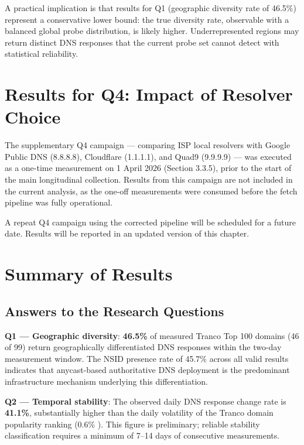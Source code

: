 A practical implication is that results for Q1 (geographic diversity rate of 46.5\%) represent a conservative lower bound: the true diversity rate, observable with a balanced global probe distribution, is likely higher. Underrepresented regions may return distinct DNS responses that the current probe set cannot detect with statistical reliability.

\bigskip
\section{Results for Q4: Impact of Resolver Choice}
\label{sec:4.5}

The supplementary Q4 campaign --- comparing ISP local resolvers with Google Public DNS (8.8.8.8), Cloudflare (1.1.1.1), and Quad9 (9.9.9.9) --- was executed as a one-time measurement on 1 April 2026 (Section 3.3.5), prior to the start of the main longitudinal collection. Results from this campaign are not included in the current analysis, as the one-off measurements were consumed before the fetch pipeline was fully operational.

A repeat Q4 campaign using the corrected pipeline will be scheduled for a future date. Results will be reported in an updated version of this chapter.

\bigskip
\section{Summary of Results}
\label{sec:4.6}

\subsection{Answers to the Research Questions}
\label{subsec:4.6.1}

\textbf{Q1 --- Geographic diversity}: \textbf{46.5\%} of measured Tranco Top 100 domains (46 of 99) return geographically differentiated DNS responses within the two-day measurement window. The NSID presence rate of 45.7\% across all valid results indicates that anycast-based authoritative DNS deployment is the predominant infrastructure mechanism underlying this differentiation.

\textbf{Q2 --- Temporal stability}: The observed daily DNS response change rate is \textbf{41.1\%}, substantially higher than the daily volatility of the Tranco domain popularity ranking (0.6\% \cite{LePochat2019}). This figure is preliminary; reliable stability classification requires a minimum of 7--14 days of consecutive measurements.

